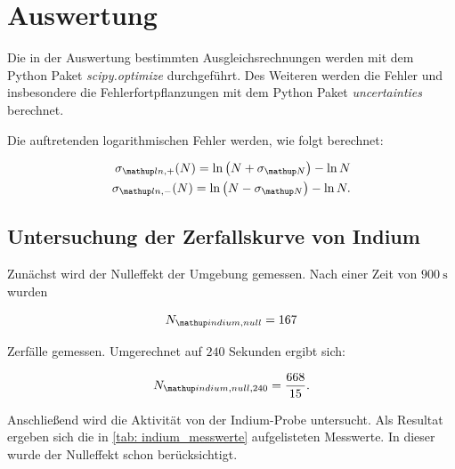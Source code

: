 \section{Auswertung}

Die in der Auswertung bestimmten Ausgleichsrechnungen werden mit
dem Python Paket \emph{scipy.optimize}\cite{scipy} durchgeführt.
Des Weiteren werden die Fehler und insbesondere die Fehlerfortpflanzungen
mit dem Python Paket \emph{uncertainties}\cite{uncertainties} berechnet.

Die auftretenden logarithmischen Fehler werden, wie folgt berechnet:

\begin{align}
  \label{eq:log_fehler}
  \begin{aligned}
    \sigma\ua{ln,+}(N)=\ln{\left(N+\sigma\ua{N}\right)}-\ln{N}\\
    \sigma\ua{ln,-}(N)=\ln{\left(N-\sigma\ua{N}\right)}-\ln{N}.
  \end{aligned}
\end{align}
\subsection{Untersuchung der Zerfallskurve von Indium}
Zunächst wird der Nulleffekt der Umgebung gemessen.
Nach einer Zeit von $\SI{900}{\second}$ wurden

\begin{equation*}
  N\ua{indium,null}=167
\end{equation*}

Zerfälle gemessen. Umgerechnet auf $240$ Sekunden ergibt sich:

\begin{equation}
  \label{eq:nulleffekt_indium}
   N\ua{indium,null,240}=\frac{668}{15}.
\end{equation}

Anschließend wird die Aktivität von der Indium-Probe untersucht.
Als Resultat ergeben sich die in \ref{tab: indium_messwerte} aufgelisteten Messwerte.
In dieser wurde der Nulleffekt schon berücksichtigt.


